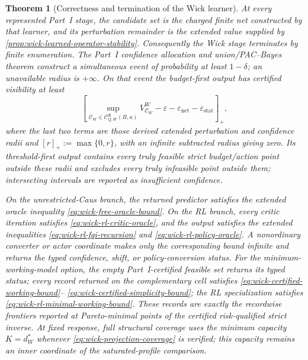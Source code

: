 \documentclass[11pt]{article}
\numberwithin{section}{part}
\theoremstyle{plain}
\newtheorem{theorem}{Theorem}[section]
\theoremstyle{definition}
\theoremstyle{remark}
\begin{document}
\begin{theorem}[Correctness and termination of the Wick learner]
\label{thm:wick-learner-correctness}
At every represented Part~I stage, the candidate set is the charged finite
net constructed by that learner, and its perturbation remainder is the
extended value supplied by \cref{prop:wick-learned-operator-stability}.
Consequently the Wick stage terminates by finite enumeration.  The Part~I
confidence allocation and union/PAC--Bayes theorem construct a simultaneous
event of probability at least \(1-\delta\); an unavailable radius is
\(+\infty\).  On that event the budget-first output has certified
visibility at least
\begin{equation}
 \label{eq:wick-learner-oracle}
 \left[
 \sup_{\mathscr C_W\in\mathcal C_{Q,W}^{\mathfrak A}(B,a)}
 V^W_{\mathscr C_W}
 -\varepsilon-\varepsilon_{\mathrm{net}}-\varepsilon_{\mathrm{stat}}
 \right]_+,
\end{equation}
where the last two terms are those derived extended perturbation and
confidence radii and \([r]_+:=\max\{0,r\}\), with an infinite subtracted
radius giving zero.  Its threshold-first output contains every truly feasible strict
budget/action point outside these radii and excludes every truly infeasible
point outside them; intersecting intervals are reported as insufficient
confidence.

On the unrestricted-Caus branch, the returned predictor satisfies the
extended oracle inequality \eqref{eq:wick-free-oracle-bound}.  On the RL
branch, every critic iteration satisfies \eqref{eq:wick-rl-critic-oracle},
and the output satisfies the extended inequalities
\eqref{eq:wick-rl-fqi-recursion} and
\eqref{eq:wick-rl-policy-oracle}.  A nonordinary converter or actor coordinate
makes only the corresponding bound infinite and returns the typed confidence,
shift, or policy-conversion status.
For the minimum-working-model option, the empty Part~I-certified feasible set
returns its typed status; every record returned on the complementary cell
satisfies
\eqref{eq:wick-certified-working-bound}--
\eqref{eq:wick-certified-simplicity-bound}; the RL specialization satisfies
\eqref{eq:wick-rl-minimal-working-bound}.  These records are exactly the
recordwise frontiers reported at Pareto-minimal points of the certified
risk-qualified strict inverse.  At fixed response, full structural
coverage uses the minimum capacity \(K=d_W^*\) whenever
\eqref{eq:wick-projection-coverage} is verified; this capacity remains an
inner coordinate of the saturated-profile comparison.


\end{theorem}
\end{document}
